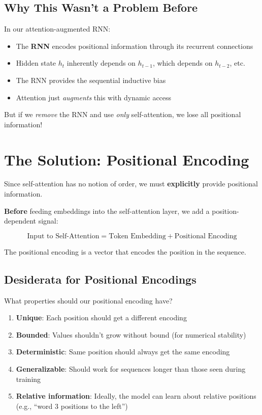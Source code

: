 \documentclass{article}
\begin{document}
\subsection{Why This Wasn't a Problem Before}

In our attention-augmented RNN:
\begin{itemize}
\item The \textbf{RNN} encodes positional information through its recurrent connections
\item Hidden state $h_t$ inherently depends on $h_{t-1}$, which depends on $h_{t-2}$, etc.
\item The RNN provides the sequential inductive bias
\item Attention just \textit{augments} this with dynamic access
\end{itemize}

But if we \textit{remove} the RNN and use \textit{only} self-attention, we lose all positional information!

\section{The Solution: Positional Encoding}
Since self-attention has no notion of order, we must \textbf{explicitly} provide positional information.

\begin{tcolorbox}[colback=green!5!white, colframe=green!50!black, title=Positional Encoding Strategy]
\textbf{Before} feeding embeddings into the self-attention layer, we add a position-dependent signal:

\[
\text{Input to Self-Attention} = \text{Token Embedding} + \text{Positional Encoding}
\]

The positional encoding is a vector that encodes the position in the sequence.
\end{tcolorbox}

\subsection{Desiderata for Positional Encodings}

What properties should our positional encoding have?

\begin{enumerate}
\item \textbf{Unique}: Each position should get a different encoding
\item \textbf{Bounded}: Values shouldn't grow without bound (for numerical stability)
\item \textbf{Deterministic}: Same position should always get the same encoding
\item \textbf{Generalizable}: Should work for sequences longer than those seen during training
\item \textbf{Relative information}: Ideally, the model can learn about relative positions (e.g., ``word 3 positions to the left'')
\end{enumerate}
\end{document}
